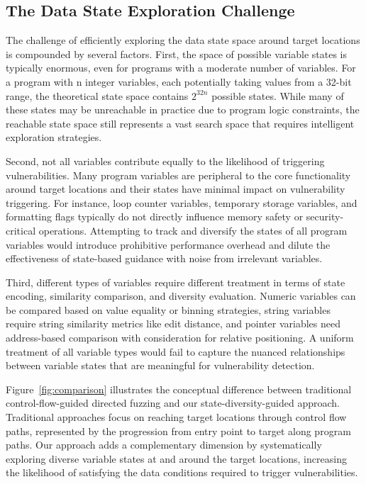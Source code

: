 \documentclass[review]{elsarticle}
\begin{document}
\subsection{The Data State Exploration Challenge}

The challenge of efficiently exploring the data state space around target locations is compounded by several factors. First, the space of possible variable states is typically enormous, even for programs with a moderate number of variables. For a program with n integer variables, each potentially taking values from a 32-bit range, the theoretical state space contains $2^{32n}$ possible states. While many of these states may be unreachable in practice due to program logic constraints, the reachable state space still represents a vast search space that requires intelligent exploration strategies.

Second, not all variables contribute equally to the likelihood of triggering vulnerabilities. Many program variables are peripheral to the core functionality around target locations and their states have minimal impact on vulnerability triggering. For instance, loop counter variables, temporary storage variables, and formatting flags typically do not directly influence memory safety or security-critical operations. Attempting to track and diversify the states of all program variables would introduce prohibitive performance overhead and dilute the effectiveness of state-based guidance with noise from irrelevant variables.

Third, different types of variables require different treatment in terms of state encoding, similarity comparison, and diversity evaluation. Numeric variables can be compared based on value equality or binning strategies, string variables require string similarity metrics like edit distance, and pointer variables need address-based comparison with consideration for relative positioning. A uniform treatment of all variable types would fail to capture the nuanced relationships between variable states that are meaningful for vulnerability detection.

Figure~\ref{fig:comparison} illustrates the conceptual difference between traditional control-flow-guided directed fuzzing and our state-diversity-guided approach. Traditional approaches focus on reaching target locations through control flow paths, represented by the progression from entry point to target along program paths. Our approach adds a complementary dimension by systematically exploring diverse variable states at and around the target locations, increasing the likelihood of satisfying the data conditions required to trigger vulnerabilities.
\end{document}
